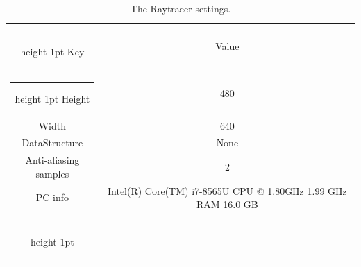 \documentclass[11pt,a4paper]{article}
\makeatletter
\newcommand{\thickhline}{%
	\noalign {\ifnum 0=`}\fi \hrule height 1pt
	\futurelet \reserved@a \@xhline
}
\makeatother
\begin{document}
	\begin{table}[h]
		\centering
		\begin{tabular}{ c|c  }
			\thickhline%
			Key   &   Value \\
			\thickhline%
			Height   &   480 \\
			
			
			Width   & 640 \\
			
			
			DataStructure   & None \\
			
			
			Anti-aliasing samples  & 2 \\
			
			
			PC info  & 	Intel(R) Core(TM) i7-8565U CPU @ 1.80GHz   1.99 GHz  RAM	16.0 GB\\
			\thickhline%
		\end{tabular}
				\caption{The Raytracer settings.}
	\label{table:2}
	\end{table}
 
\end{document}
